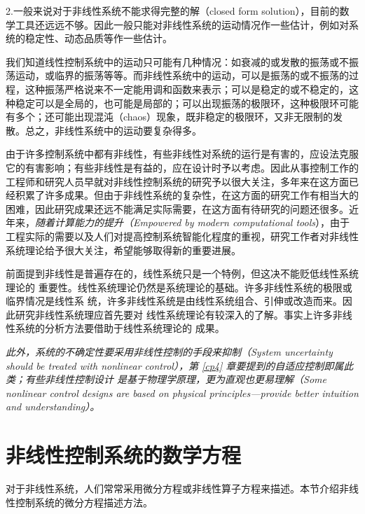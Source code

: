 2.一般来说对于非线性系统不能求得完整的解（closed form solution），目前的数学工具还远远不够。因此一般只能对非线性系统的运动情况作一些估计，例如对系统的稳定性、动态品质等作一些估计。

我们知道线性控制系统中的运动只可能有几种情况：如衰减的或发散的振荡或不振荡运动，或临界的振荡等等。而非线性系统中的运动，可以是振荡的或不振荡的过程，这种振荡严格说来不一定能用调和函数来表示；可以是稳定的或不稳定的，这种稳定可以是全局的，也可能是局部的；可以出现振荡的极限环，这种极限环可能有多个；还可能出现混沌（chaos）现象，既非稳定的极限环，又非无限制的发散。总之，非线性系统中的运动要复杂得多。

由于许多控制系统中都有非线性，有些非线性对系统的运行是有害的，应设法克服它的有害影响；有些非线性是有益的，应在设计时予以考虑。因此从事控制工作的工程师和研究人员早就对非线性控制系统的研究予以很大关注，多年来在这方面已经积累了许多成果。但由于非线性系统的复杂性，在这方面的研究工作有相当大的困难，因此研究成果还远不能满足实际需要，在这方面有待研究的问题还很多。近年来，{\it 随着计算能力的提升（Empowered by modern computational tools}），由于工程实际的需要以及人们对提高控制系统智能化程度的重视，研究工作者对非线性系统理论给予很大关注，希望能够取得新的重要进展。

前面提到非线性是普遍存在的，线性系统只是一个特例，但这决不能贬低线性系统理论的
重要性。线性系统理论仍然是系统理论的基础。许多非线性系统的极限或临界情况是线性系
统，许多非线性系统是由线性系统组合、引伸或改造而来。因此研究非线性系统理应首先要对
线性系统理论有较深入的了解。事实上许多非线性系统的分析方法要借助于线性系统理论的
成果。

{\it 此外，系统的不确定性要采用非线性控制的手段来抑制（{\it System uncertainty should be treated with nonlinear control}），第 \ref{cp4} 章要提到的自适应控制即属此类；有些非线性控制设计
是基于物理学原理，更为直观也更易理解（{\it Some nonlinear control designs are based on physical principles---provide
better intuition and understanding}）。}


\section{非线性控制系统的数学方程}\label{1Bref}

对于非线性系统，人们常常采用微分方程或非线性算子方程来描述。本节介绍非线性控制系统的微分方程描述方法。

